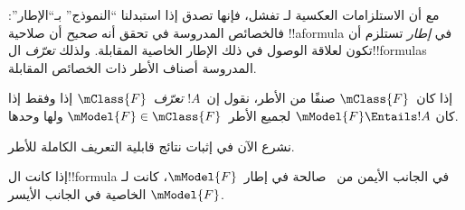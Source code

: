 \documentclass[../../../include/open-logic-section]{subfiles}
\begin{document}


مع أن الاستلزامات العكسية لـ تفشل، فإنها
تصدق إذا استبدلنا ``النموذج'' بـ``الإطار'': فالخصائص المدروسة في
 تحقق أنه \emph{صحيح} أن صلاحية
!!a{formula} في \emph{إطار} تستلزم أن تكون لعلاقة الوصول في ذلك
الإطار الخاصية المقابلة. ولذلك \emph{تعرّف} ال!!{formula}s المدروسة
أصناف الأطر ذات الخصائص المقابلة.

\begin{defn}
  إذا كان~$\mClass{F}$ صنفًا من الأطر، نقول إن~$!A$
  \emph{تعرّف}~$\mClass{F}$ إذا وفقط إذا كان
  $\mModel{F} \Entails !A$ لجميع الأطر~$\mModel{F} \in \mClass{F}$
  ولها وحدها.
\end{defn}

نشرع الآن في إثبات نتائج قابلية التعريف الكاملة للأطر.

\begin{thm}
إذا كانت ال!!{formula} في الجانب الأيمن من~
صالحة في إطار~$\mModel{F}$، كانت لـ$\mModel{F}$ الخاصية في الجانب
الأيسر.
\end{thm}
\end{document}
